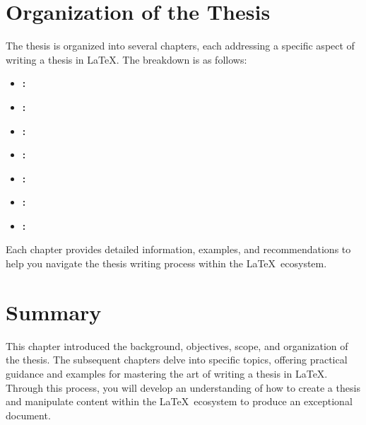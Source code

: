 	\section{Organization of the Thesis}
		The thesis is organized into several chapters, each addressing a specific aspect of writing a thesis in \LaTeX. 
		The breakdown is as follows:
		\begin{itemize}
			\item \textbf{:}  
			\item \textbf{:}  
			\item \textbf{:}  
			\item \textbf{:}  
			\item \textbf{:}  
			\item \textbf{:}  
			\item \textbf{:}  
		\end{itemize}

		Each chapter provides detailed information, examples, and recommendations to help you navigate the thesis writing process within the \LaTeX\ ecosystem.

	\section{Summary}
		This chapter introduced the background, objectives, scope, and organization of the thesis. 
		The subsequent chapters delve into specific topics, offering practical guidance and examples for mastering the art of writing a thesis in \LaTeX.
		Through this process, you will develop an understanding of how to create a thesis and manipulate content within the \LaTeX\ ecosystem to produce an exceptional document.